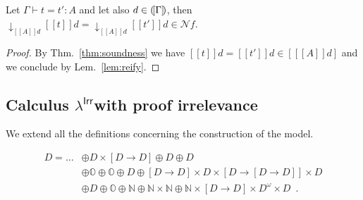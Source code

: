 \documentclass{LMCS}
\theoremstyle{plain}\newtheorem{satz}[thm]{Satz}
\newcommand{\LONGVERSION}[1]{#1}
\newcommand{\SHORTVERSION}[1]{}
\newcommand{\lambdaPI}{\texorpdfstring{\ensuremath{\lambda^{\mathsf{Irr}}}}{Proof-irrelevance}}
\newcommand{\into}{\rightarrow}
\newcommand{\boxty}[1]{[#1]}
\newcommand{\boxtm}[1]{[#1]}
\newcommand{\deqterm}[4]{#1\vdash#3=#4:#2}
\newcommand{\Da}[1]{\mathop{\Downarrow} #1}
\newcommand{\upa}[2]{\mathop{\uparrow}\nolimits_{#1}{#2}}
\newcommand{\da}[2]{\mathop{\downarrow}\nolimits_{#1}{#2}}
\newcommand{\reify}[2]{\mathsf{R}_{#1}\,#2}
\newcommand{\pernf}{\mathord{\mathcal{N}\!\mathit{f}}}
\newcommand{\perT}{\mathcal{T}}
\newcommand{\semc}[1]{[\![#1]\!]}
\newcommand{\oprf}{\dprf}
\newcommand{\dprf}{\star}
\renewcommand{\boxty}[1]{\mathsf{Prf}\,#1}
\newcommand{\prf}[1]{\mathsf{Prf}\,#1}
\newcommand{\whereraw}{\mathsf{where}}
\newcommand{\wheretm}[3]{#1\,\whereraw\!^{#3}\,#2}
\newcommand{\tnrecd}{[D\into D]\times D\times[D\into [D\into D]]\times D}
\newcommand{\LONGVERSION}[1]{}
\newcommand{\SHORTVERSION}[1]{#1}
\newcommand{\PrfIrrTitle}{\subsection{Calculus \lambdaPI with proof irrelevance}}
\begin{document}
\SHORTVERSION{
\begin{thm}[Soundness of the Judgements]
  \label{thm:soundness}
  if $\Gamma \vdash J$, then $\Gamma\vDash J$.
\end{thm}
\begin{proof} By easy induction on $\Gamma \vdash J$. 
\end{proof}
}

\begin{thm}
  \label{thm:completeness}
  Let $\deqterm{\Gamma}{A}{t}{t'}$ and let also $d\in (\![{\Gamma}]\!)$, then\linebreak
  $\da{\semc{A}d}{\semc{t}d}=\da{\semc{A}d}{\semc{t'}d}\in \pernf$.
\end{thm}
\begin{proof}
  By Thm.~\ref{thm:soundness} we have $\semc{t}d = \semc{t'}d \in [\semc{A}d]$
  and we conclude by Lem.~\ref{lem:reify}.
\end{proof}


\PrfIrrTitle

\label{sec:pi-model}

\LONGVERSION{
We extend all the definitions concerning the construction of the model.

\begin{defi}[Extension of domain $D$]
  \[
  \begin{split}
    D = \ldots &\oplus D \times [D \into D] \oplus D \oplus D\\ &\oplus\mathbb{O} \oplus \mathbb{O} \oplus D\oplus \tnrecd\\
    &\oplus D \oplus \mathbb{O} \oplus \mathbb{N} \oplus \mathbb{N}
    \times \mathbb{N} \oplus \mathbb{N} \times [D\into D]\times
    D^\omega \times D\enspace .
  \end{split}
  \]
\end{defi}

}
\SHORTVERSION{
  We extend all the definition concerning the construction of the model;
  \[
  D = \ldots \oplus D \oplus \mathbb{O} \enspace ; 
  \]
  the new inhabitants will be written as $\prf{d}$, and $\dprf$,
  respectively.  The read-back function is extended by the equations
  $\reify{j}{(\prf{d})} = \boxty{(\reify{j}{d})}$ and
  $\reify{j}{\dprf} = \oprf$.  We add a new clause in the definition
  of $\perT$,
\[
\mbox{if } X = X' \in \perT \mbox{, then } \prf{X} = \prf{X'} \in
\perT \mbox{, and } [\prf{X}] = \{(\dprf,\dprf)\} \enspace .
\]
The definitions of normalisation and expansion are extended for
$\prf{X}$,
  \begin{align*}
    \upa{\prf{X}}{d} & = \dprf& \da{\prf{X}}{d} & = \dprf&
    \Da{\prf{X}}& = \prf{\Da{X}} \enspace .&
  \end{align*}
  The semantic equations for the new constructions are
  \begin{align*}
    \semc{\boxty{A}}d &= \prf{\semc{A}d}&
    \semc{\boxtm{a}}d &= \dprf&\\
    \semc{\wheretm{b}{t}{B}}d &= \dprf&
    \semc{\oprf}d &=  \dprf \enspace . &
  \end{align*}
} 
\end{document}

